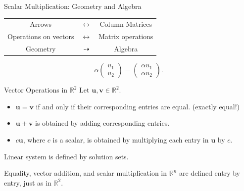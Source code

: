 \begin{frame}{Scalar Multiplication: Geometry and Algebra}
  \begin{center}
    \begin{tabular}{ccc}
        Arrows& $\longleftrightarrow$ &Column Matrices\\

    Operations on vectors &$\longleftrightarrow$ &Matrix operations\\

    Geometry& $\dashrightarrow$ &Algebra\\
    \end{tabular}
    
  \end{center}
  \[
    \alpha\begin{pmatrix}u_1\\u_2\end{pmatrix}
    =
    \begin{pmatrix}\alpha u_1\\\alpha u_2\end{pmatrix}.
  \]
\end{frame}

\begin{frame}{Vector Operations in $\mathbb{R}^2$}
  Let $\mathbf{u},\mathbf{v}\in\mathbb{R}^2$.
  \begin{itemize}
    \item $\mathbf{u}=\mathbf{v}$ if and only if their corresponding entries
          are equal. (exactly equal!)
    \item $\mathbf{u}+\mathbf{v}$ is obtained by adding corresponding entries. 
    \item $c\mathbf{u}$, where $c$ is a scalar, is obtained by multiplying
          each entry in $\mathbf{u}$ by $c$.
  \end{itemize}
  Linear system is defined by solution sets.

  Equality, vector addition, and scalar multiplication in $\mathbb{R}^n$ are defined entry by entry, just as in $\mathbb{R}^2$.
\end{frame}

